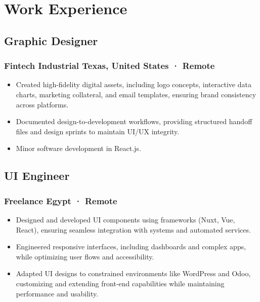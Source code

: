\section*{Work Experience}
%
%
%
%
%
%
%
%
\subsection*{
	Graphic Designer
	\hspace*{\fill}
}
\subsubsection*{
	Fintech Industrial 
	\hspace*{\fill}
	\smallFormat Texas, United States · Remote
}
\begin{itemize}
	\item Created high-fidelity digital assets, including logo concepts, interactive data charts, marketing collateral, and email templates, ensuring brand consistency across platforms.
	\item Documented design-to-development workflows, providing structured handoff files and design sprints to maintain UI/UX integrity.
	\item Minor software development in React.js.
\end{itemize}
%
%
%
%
\subsection*{
	UI Engineer
	\hspace*{\fill}
}
\subsubsection*{
	Freelance
	\hspace*{\fill}
	\smallFormat Egypt · Remote
}
\begin{itemize}
	\item Designed and developed UI components using frameworks (Nuxt, Vue, React), ensuring seamless integration with systems and automated services.
	\item Engineered responsive interfaces, including dashboards and complex apps, while optimizing user flows and accessibility.
	\item Adapted UI designs to constrained environments like WordPress and Odoo, customizing and extending front-end capabilities while maintaining performance and usability.
\end{itemize}
